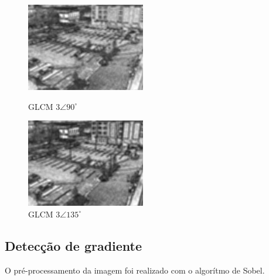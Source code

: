 \documentclass[10pt,twocolumn,letterpaper]{article}
\begin{document}
\begin{figure}[!htb]
  \includegraphics[width=\linewidth]{GLCM90-Homogeneidade.jpg}
  \caption{GLCM $3\angle 90^{\circ}$}\label{fig:glcm90}
\endminipage\hfill
{}
  \includegraphics[width=\linewidth]{GLCM135-Homogeneidade.jpg}
  \caption{GLCM $3\angle 135^{\circ}$}\label{fig:glcm135}
\endminipage
\end{figure}


\subsection{Detecção de gradiente}
	
	O pré-processamento da imagem foi realizado com o algorítmo de Sobel.
\end{document}
